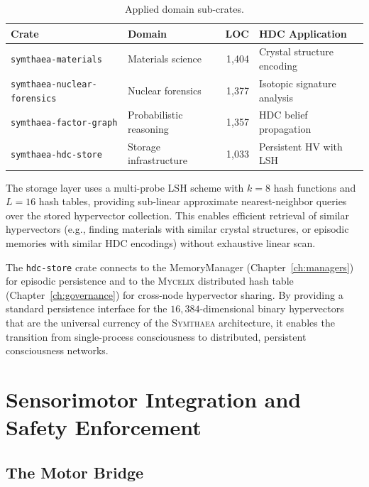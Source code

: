 \documentclass[12pt]{book}
\newcommand{\symthaea}{\textsc{Symthaea}}
\newcommand{\mycelix}{\textsc{Mycelix}}
\newcommand{\dimHDC}{16{,}384}
\begin{document}
\begin{table}[htbp]
\centering
\caption{Applied domain sub-crates.}
\label{tab:applied-domains}
\begin{tabular}{llrl}
\toprule
\textbf{Crate} & \textbf{Domain} & \textbf{LOC} & \textbf{HDC Application} \\
\midrule
\texttt{symthaea-materials} & Materials science & 1,404 & Crystal structure encoding \\
\texttt{symthaea-nuclear-forensics} & Nuclear forensics & 1,377 & Isotopic signature analysis \\
\texttt{symthaea-factor-graph} & Probabilistic reasoning & 1,357 & HDC belief propagation \\
\texttt{symthaea-hdc-store} & Storage infrastructure & 1,033 & Persistent HV with LSH \\
\bottomrule
\end{tabular}
\end{table}

The storage layer uses a multi-probe LSH scheme with $k = 8$ hash functions and $L = 16$ hash tables, providing sub-linear approximate nearest-neighbor queries over the stored hypervector collection. This enables efficient retrieval of similar hypervectors (e.g., finding materials with similar crystal structures, or episodic memories with similar HDC encodings) without exhaustive linear scan.

The \texttt{hdc-store} crate connects to the MemoryManager (Chapter~\ref{ch:managers}) for episodic persistence and to the \mycelix{} distributed hash table (Chapter~\ref{ch:governance}) for cross-node hypervector sharing. By providing a standard persistence interface for the $\dimHDC$-dimensional binary hypervectors that are the universal currency of the \symthaea{} architecture, it enables the transition from single-process consciousness to distributed, persistent consciousness networks.


\chapter{Sensorimotor Integration and Safety Enforcement}
\label{ch:sensorimotor}

\section{The Motor Bridge}
\end{document}
